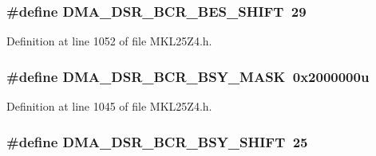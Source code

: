 \subsubsection[{\texorpdfstring{D\+M\+A\+\_\+\+D\+S\+R\+\_\+\+B\+C\+R\+\_\+\+B\+E\+S\+\_\+\+S\+H\+I\+FT}{DMA_DSR_BCR_BES_SHIFT}}]{\setlength{\rightskip}{0pt plus 5cm}\#define D\+M\+A\+\_\+\+D\+S\+R\+\_\+\+B\+C\+R\+\_\+\+B\+E\+S\+\_\+\+S\+H\+I\+FT~29}\hypertarget{group___d_m_a___register___masks_gab1def5f4a93f7f0ed1d7c5d854471358}{}\label{group___d_m_a___register___masks_gab1def5f4a93f7f0ed1d7c5d854471358}


Definition at line 1052 of file M\+K\+L25\+Z4.\+h.

\subsubsection[{\texorpdfstring{D\+M\+A\+\_\+\+D\+S\+R\+\_\+\+B\+C\+R\+\_\+\+B\+S\+Y\+\_\+\+M\+A\+SK}{DMA_DSR_BCR_BSY_MASK}}]{\setlength{\rightskip}{0pt plus 5cm}\#define D\+M\+A\+\_\+\+D\+S\+R\+\_\+\+B\+C\+R\+\_\+\+B\+S\+Y\+\_\+\+M\+A\+SK~0x2000000u}\hypertarget{group___d_m_a___register___masks_ga517e206a9b5422e95b875d13973d6888}{}\label{group___d_m_a___register___masks_ga517e206a9b5422e95b875d13973d6888}


Definition at line 1045 of file M\+K\+L25\+Z4.\+h.

\subsubsection[{\texorpdfstring{D\+M\+A\+\_\+\+D\+S\+R\+\_\+\+B\+C\+R\+\_\+\+B\+S\+Y\+\_\+\+S\+H\+I\+FT}{DMA_DSR_BCR_BSY_SHIFT}}]{\setlength{\rightskip}{0pt plus 5cm}\#define D\+M\+A\+\_\+\+D\+S\+R\+\_\+\+B\+C\+R\+\_\+\+B\+S\+Y\+\_\+\+S\+H\+I\+FT~25}\hypertarget{group___d_m_a___register___masks_gaa9f53140b5fb6fbbf7cae9d4190bac47}{}\label{group___d_m_a___register___masks_gaa9f53140b5fb6fbbf7cae9d4190bac47}


